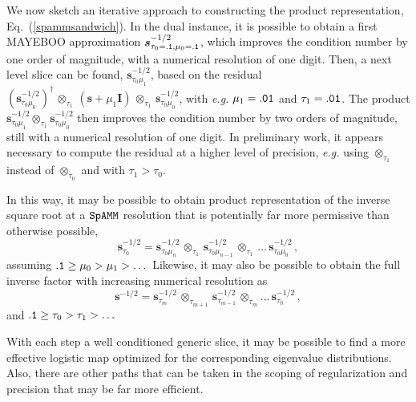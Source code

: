\documentclass[letterpaper,twocolumn,amsmath,amsfont,amssymb,english,aps,jcp,preprintnumbers,groupaddress,nofootinbib,tightenlines,floatfix]{revtex4}
\newcommand{\mat}[1]{\boldsymbol{#1}}
\newcommand{\oto}{ {\scriptstyle \otimes}_{ \! \tau_0 } }
\newcommand{\otone}{ {\scriptstyle \otimes}_{ \! \tau_1 } }
\newcommand{\otm}{ {\scriptstyle \otimes}_{ \! \tau_m } }
\newcommand{\otpm}{ {\scriptstyle \otimes}_{ \! \tau_{m+1}}}
\theoremstyle{plain}
\theoremstyle{remark}
\theoremstyle{plain}
\begin{document}
We now sketch an iterative approach to constructing the product representation, Eq.~(\ref{spammsandwich}).
In the dual instance, it is possible to obtain a first MAYEBOO approximation $\mat{s}^{-1/2}_{\tau_0={\tt .1}, \mu_0={\tt .1}}$,
which improves the condition number by one order of magnitude, with a numerical resolution of one digit.
Then, a next level slice can be found, $\mat{s}^{-1/2}_{\tau_0 \mu_1}$, based on the residual 
$\left(\mat{s}^{-1/2}_{\tau_0\mu_0} \right)^\dagger \, \otone \, \left(\mat{s}+\mu_1 \mat{I} \right)  
\, \otone \,\mat{s}^{-1/2}_{\tau_0 \mu_0} $, with {\em e.g.} 
$\mu_1= \tt .01$ and $\tau_1={\tt .01}$.   The product $\mat{s}^{-1/2}_{\tau_0 \mu_1}  \otone \mat{s}^{-1/2}_{\tau_0 \mu_0}$
then improves the condition number by two orders of magnitude, still with a numerical resolution of one digit.
In preliminary work, it appears necessary to compute the residual at a higher level of precision, 
{\em e.g.} using $\otone$ instead of $\oto$ and with $\tau_1 > \tau_0$.

In this way,  it may be possible to obtain product representation of the inverse square root at a $\tt SpAMM$ resolution that is
potentially far more permissive than otherwise possible,
\begin{equation} \label{product_rep}
\mat{s}^{-1/2}_{\tau_0} = \mat{s}^{-1/2}_{\tau_0 \mu_n} \, \otone \, \mat{s}^{-1/2}_{\tau_0 \mu_{n-1}} \, \otone \, \dots  \,  \mat{s}^{-1/2}_{\tau_0 \mu_0} \, ,
\end{equation}
assuming ${\tt .1} \ge \mu_0 > \mu_1 > \dots$  Likewise, it may also  be possible to obtain the full inverse factor with 
increasing numerical resolution as 
\begin{equation} \label{product_rep_tau}
\mat{s}^{-1/2} = \mat{s}^{-1/2}_{\tau_m} \, \otpm \,  \mat{s}^{-1/2}_{\tau_{m-1}} \, \otm \dots \, \mat{s}^{-1/2}_{\tau_0} \, ,
\end{equation}
and ${\tt .1} \ge  \tau_0 > \tau_1 > \dots $   

With each step a well conditioned generic slice, it may be possible to find a more effective logistic map optimized 
for the corresponding eigenvalue distributions. 
Also, there are  other paths that can be taken in the scoping of regularization and precision that
may be far more efficient. 

\end{document}
